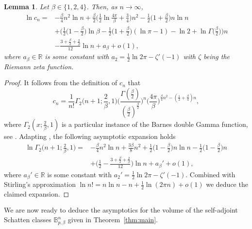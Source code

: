 \documentclass[a4paper,12pt,reqno]{amsart}
\newtheorem{lemma}[theorem]{Lemma}
\theoremstyle{definition}
\newcommand{\IR}{\mathbb{R}}
\newcommand{\bpb}{\mathbb{B}_{p,\beta}^n}
\begin{document}
\begin{lemma} \label{lem:cn}
Let $\beta\in \{1,2,4\}$. Then, as $n\to\infty$,
\begin{align*}
\ln c_{n}
=&-\frac{\beta}{4}n^2\ln n + \frac{\beta}{2}\Big(\frac{1}{2}\ln \frac{4\pi}{\beta}+\frac{3}{4}\Big)n^2-\frac{1}{2}\Big(1+\frac{\beta}{2}\Big)n\ln n\\
&+\Big(\frac{1}{2}\Big(1-\frac{\beta}{2}\Big)\ln \beta -\frac{1}{2}\Big(1+\frac{\beta}{2}\Big)(\ln \pi-1)-\ln 2+\ln \Gamma\Big(\frac{\beta}{2}\Big)\Big)n\\
&-\frac{3+\frac{\beta}{2}+\frac{2}{\beta}}{12}\ln n
+a_{\beta}+o(1),
\end{align*}
where $a_{\beta}\in \IR$ is some constant with $a_2=\frac{1}{2}\ln 2\pi-\zeta'(-1)$ with $\zeta$ being the Riemann zeta function.
\end{lemma}
\begin{proof}
It follows from the definition of $c_{n}$ that 
\[
c_{n}
=\frac{1}{n!}\Gamma_2\Big(n+1;\frac{2}{\beta},1\Big)\bigg(\frac{\Gamma(\frac{\beta}{2})}{(\frac{\beta}{2})^{\frac{\beta}{2}}}\bigg)^n\Big(\frac{4\pi}{\beta}\Big)^{\frac{\beta}{4}n^2-(\frac{1}{2}+\frac{\beta}{4})n},
\]
where $\Gamma_2(x;\frac{2}{\beta},1)$ is a particular instance of the Barnes double Gamma function, see \cite{BG24,Spr09}. Adapting \cite[eq. (7.17)]{BG24}, the following asymptotic expansion holds
\begin{align*}
\ln \Gamma_2\Big(n+1;\frac{2}{\beta},1\Big)	
=&-\frac{\beta}{4}n^2\ln n+\frac{3\beta}{8}n^2+\frac{1}{2}\Big(1-\frac{\beta}{2}\Big)n\ln n-\frac{1}{2}\Big(1-\frac{\beta}{2}\Big)n\\
&+\bigg(\frac{1}{2} -\frac{3+\frac{\beta}{2}+\frac{2}{\beta}}{12}\bigg)\ln n +a_{\beta}'+o(1),
\end{align*}
where $a_{\beta}'\in \IR$ is some constant with $a_{2}'=\frac{1}{2}\ln 2\pi-\zeta'(-1)$. Combined with Stirling's approximation $\ln n!=n\ln n-n+\frac{1}{2}\ln(2\pi n)+o(1)$ we deduce the claimed expansion.
\end{proof}

We are now ready to deduce the asymptotics for the volume of the self-adjoint Schatten classes $\bpb$ given in Theorem~\ref{thm:main}.
\end{document}

